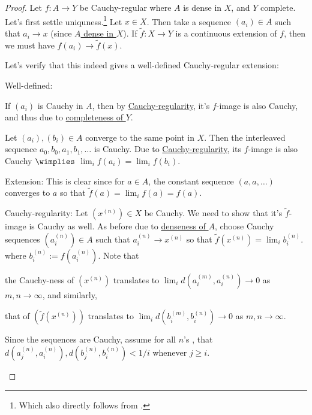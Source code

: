 	\begin{proof}
		Let $f\colon A\to Y$ be Cauchy-regular where $A$ is dense in $X$, and $Y$ complete. Let's first settle uniquness.\footnote{Which also directly follows from .} Let $x\in X$. Then take a sequence $(a_i)\in A$ such that $a_i\to x$ (since \ul{$A$ dense in $X$}). If $\tilde f\colon X\to Y$ is a continuous extension of $f$, then we must have $f(a_i)\to \tilde f(x)$.
		
		Let's verify that this indeed gives a well-defined Cauchy-regular extension:
		\begin{prooflist}
			\item Well-defined:
			\begin{mylist}
				\item If $(a_i)$ is Cauchy in $A$, then by \ul{Cauchy-regularity}, it's $f$-image is also Cauchy, and thus \cgt due to \ul{completeness of $Y$}.
				
				\item Let $(a_i), (b_i)\in A$ converge to the same point in $X$. Then the interleaved sequence $a_0, b_0, a_1, b_1, \ldots$ is Cauchy. Due to \ul{Cauchy-regularity}, its $f$-image is also Cauchy $\wimplies$ $\lim_i f(a_i) = \lim_i f(b_i)$.
			\end{mylist}
			
			
			
			\item Extension:
			This is clear since for $a\in A$, the constant sequence $(a, a, \ldots)$ converges to $a$ so that $\tilde f(a) = \lim_i f(a) = f(a)$.
			
			
			
			\item Cauchy-regularity:
			Let $(x^{(n)})\in X$ be Cauchy. We need to show that it's $\tilde f$-image is Cauchy as well. As before due to \ul{denseness of $A$}, choose Cauchy sequences $( a^{(n)}_i )\in A$ such that $a^{(n)}_i\to x^{(n)}$ so that $\tilde f(x^{(n)}) = \lim_i b^{(n)}_i$. where $b^{(n)}_i := f(a^{(n)}_i)$. Note that
			\begin{mylist}
				\item the Cauchy-ness of $(x^{(n)})$ translates to $\lim_i d(a^{(m)}_i, a^{(n)}_i)\to 0$ as $m, n\to\infty$, and similarly,
				
				\item that of $(\tilde f(x^{(n)}))$ translates to $\lim_i d(b^{(m)}_i, b^{(n)}_i)\to 0$ as $m, n\to\infty$.
			\end{mylist}
			Since the sequences are Cauchy, assume for all $n$'s \wlogg, that $d(a^{(n)}_j, a^{(n)}_i), d(b^{(n)}_j, b^{(n)}_i) < 1/i$ whenever $j\ge i$.
			

\end{prooflist}
\end{proof}
